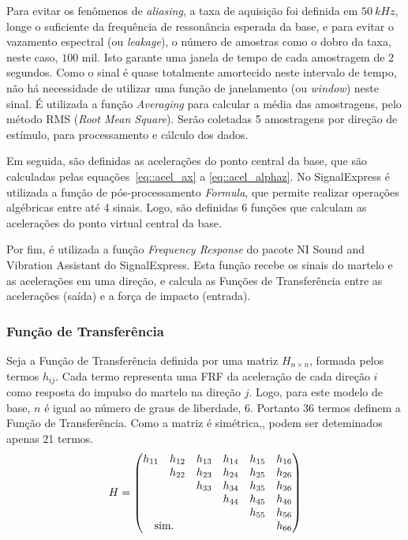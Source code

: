 Para evitar os fenômenos de \textit{aliasing}, a taxa de aquisição foi definida
em $50~kHz$, longe o suficiente da frequência de
ressonância esperada da base, e para evitar o vazamento espectral (ou
\textit{leakage}), o número de amostras como o dobro da taxa, neste caso, $100$
mil. Isto garante uma janela de tempo de cada amostragem de 2 segundos. Como o
sinal é quase totalmente amortecido neste intervalo de tempo, não há necessidade
de utilizar uma função de janelamento (ou \textit{window}) neste sinal.
É utilizada a função \textit{Averaging} para calcular a média das amostragens,
pelo método RMS (\textit{Root Mean Square}).
Serão coletadas 5 amostragens por direção de estímulo, para processamento e
cálculo dos dados.

Em seguida, são definidas as acelerações do ponto central da base, que são
calculadas pelas equações~\ref{eq::acel_ax} a \ref{eq::acel_alphaz}. No
SignalExpress é utilizada a função de pós-processamento \textit{Formula}, que
permite realizar operações algébricas entre até 4 sinais. Logo, são definidas 6
funções que calculam as acelerações do ponto virtual central da base.

Por fim, é utilizada a função \textit{Frequency Response} do pacote NI Sound and
Vibration Assistant do SignalExpress. Esta função recebe  os sinais do
martelo e as acelerações em uma direção, e calcula as Funções de Transferência
entre as acelerações (saída) e a força de impacto (entrada).

\subsubsection{Função de Transferência}

Seja a Função de Transferência definida por uma matriz $H_{n \times n}$, formada
pelos termos $h_{ij}$. Cada termo representa uma FRF da aceleração de cada
direção $i$ como resposta do impulso do martelo na direção $j$. Logo, para este
modelo de base, $n$ é igual ao número de graus de liberdade, 6. Portanto 36
termos definem a Função de Transferência. Como a matriz é
simétrica,, podem ser deteminados
apenas 21 termos.
%
\begin{equation}
H =
\begin{pmatrix}
    h_{11} & h_{12} & h_{13} & h_{14} & h_{15} & h_{16} \\
		   & h_{22} & h_{23} & h_{24} & h_{25} & h_{26} \\
		   & 		& h_{33} & h_{34} & h_{35} & h_{36} \\
		   & 		&  		 & h_{44} & h_{45} & h_{46} \\
		   & 		&  		 &  	  & h_{55} & h_{56} \\
      \multicolumn{2}{c}{\text{sim.}} & & &    & h_{66} 
\end{pmatrix}
\end{equation}
%

